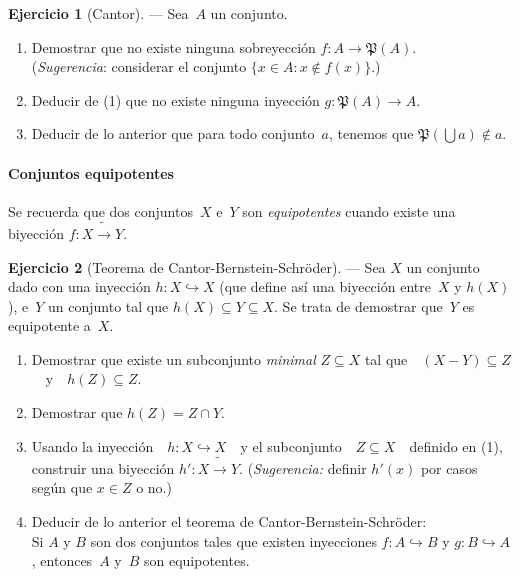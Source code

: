 \documentclass[a4paper,12pt]{book}
\def\Pow{\mathfrak{P}}
\def\into{\hookrightarrow}
\def\inonto{\mathbin{\tilde{\to}}}
\def\Pow{\mathfrak{P}}
\def\into{\hookrightarrow}
\def\inonto{\mathbin{\tilde{\to}}}
\theoremstyle{definition}
\newtheorem{ejercicio}{Ejercicio}
\begin{document}
	\begin{ejercicio}[Cantor]\label{ejer:Cantor}
		--- Sea~$A$ un conjunto.
		\begin{enumerate}
			\item[(1)] Demostrar que no existe ninguna sobreyección
			$f:A\to\Pow(A)$.\\
			(\textit{Sugerencia}: considerar el conjunto
			$\{x\in A:x\notin f(x)\}$.)
			\item[(2)] Deducir de (1) que no existe ninguna inyección
			$g:\Pow(A)\to A$.
			\item[(3)] Deducir de lo anterior que para todo conjunto~$a$,
			tenemos que $\Pow(\bigcup a)\notin a$.
		\end{enumerate}
	\end{ejercicio}
	
	
	\paragraph{Conjuntos equipotentes}
	Se recuerda que dos conjuntos~$X$ e~$Y$ son \emph{equipotentes} cuando
	existe una biyección $f:X\inonto Y$.
	
	\begin{ejercicio}[Teorema de Cantor-Bernstein-Schröder]%
		\label{ejer:CantorBernstein}
		--- Sea $X$ un conjunto dado con una inyección $h:X\into X$ (que
		define así una biyección entre~$X$ y $h(X)$), e~$Y$ un conjunto tal
		que $h(X)\subseteq Y\subseteq X$.
		Se trata de demostrar que~$Y$ es equipotente a~$X$.
		\begin{enumerate}\parskip-.5ex
			\item[(1)] Demostrar que existe un subconjunto \emph{minimal}
			$Z\subseteq X$ tal que~~$(X-Y)\subseteq Z$~~y~~$h(Z)\subseteq Z$.
			\item[(2)] Demostrar que $h(Z)=Z\cap Y$.
			\item[(3)] Usando la inyección~~$h:X\into X$~~y el
			subconjunto~~$Z\subseteq X$~~definido en (1), construir una
			biyección $h':X\inonto Y$.\hfill
			(\textit{Sugerencia:} definir $h'(x)$ por casos según que
			$x\in Z$ o no.)
			\item[(4)] Deducir de lo anterior el teorema de
			Cantor-Bernstein-Schröder:\\
			Si $A$ y $B$ son dos conjuntos tales que existen inyecciones
			$f:A\into B$ y $g:B\into A$, entonces~$A$ y~$B$ son equipotentes.
		\end{enumerate}
	\end{ejercicio}
	
\end{document}
